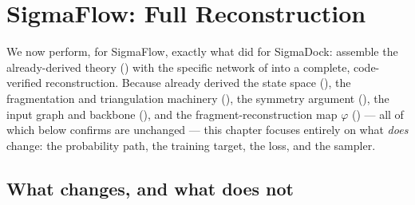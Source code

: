 \documentclass[11pt,a4paper]{report}
\theoremstyle{definition}
\theoremstyle{remark}
\begin{document}
\chapter{SigmaFlow: Full Reconstruction}
\label{chap:sigmaflow}

We now perform, for SigmaFlow, exactly what  did for
SigmaDock: assemble the already-derived theory
() with the specific network of
 into a complete, code-verified reconstruction.
Because  already derived the state space
(), the fragmentation and triangulation
machinery (), the
symmetry argument (), the input graph
and backbone (), and the fragment-reconstruction
map $\varphi$ () --- all of which
 below confirms are unchanged ---
this chapter focuses entirely on what \emph{does} change: the probability
path, the training target, the loss, and the sampler.

\section{What changes, and what does not}
\label{sec:sigmaflow-overview}
\end{document}
